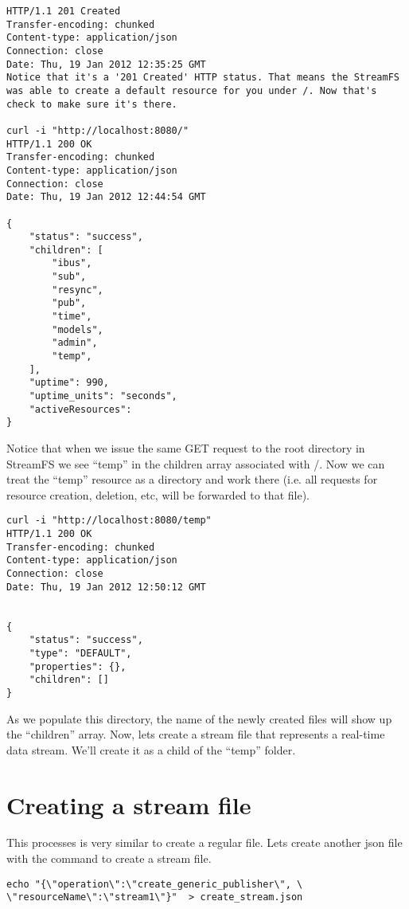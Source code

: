 \begin{lstlisting}
HTTP/1.1 201 Created
Transfer-encoding: chunked
Content-type: application/json
Connection: close
Date: Thu, 19 Jan 2012 12:35:25 GMT
Notice that it's a '201 Created' HTTP status. That means the StreamFS was able to create a default resource for you under /. Now that's check to make sure it's there.

curl -i "http://localhost:8080/"
HTTP/1.1 200 OK
Transfer-encoding: chunked
Content-type: application/json
Connection: close
Date: Thu, 19 Jan 2012 12:44:54 GMT

{
    "status": "success",
    "children": [
        "ibus",
        "sub",
        "resync",
        "pub",
        "time",
        "models",
        "admin",
        "temp",
    ],
    "uptime": 990,
    "uptime_units": "seconds",
    "activeResources": 
}
\end{lstlisting}

Notice that when we issue the same GET request to the root directory in StreamFS we see ``temp'' in the children array associated with /. Now we can treat the ``temp'' resource as a directory and work there (i.e. all requests for resource creation, deletion, etc, will be forwarded to that file).

\begin{lstlisting}
curl -i "http://localhost:8080/temp"
HTTP/1.1 200 OK
Transfer-encoding: chunked
Content-type: application/json
Connection: close
Date: Thu, 19 Jan 2012 12:50:12 GMT


{
    "status": "success",
    "type": "DEFAULT",
    "properties": {},
    "children": []
}
\end{lstlisting}

As we populate this directory, the name of the newly created files will show up the ``children'' array. Now, lets create a stream file that represents a real-time data stream. We'll create it as a child of the ``temp'' folder.

\section{Creating a stream file}

This processes is very similar to create a regular file. Lets create another json file with the command to create a stream file.

\begin{lstlisting}
echo "{\"operation\":\"create_generic_publisher\", \
\"resourceName\":\"stream1\"}"  > create_stream.json
\end{lstlisting}

